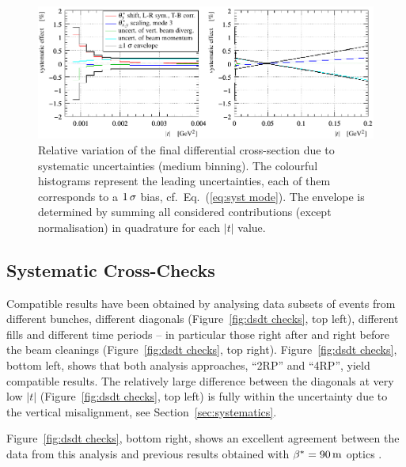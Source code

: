 \begin{figure}
\begin{center}
\includegraphics{fig/systematics_dgn_combination_summary.pdf}
\vskip-2mm
\caption{%
Relative variation of the final differential cross-section due to systematic uncertainties (medium binning). The colourful histograms represent the leading uncertainties, each of them corresponds to a $1\,{\rm \sigma}$ bias, cf.~Eq.~(\ref{eq:syst mode}). The envelope is determined by summing all considered contributions (except normalisation) in quadrature for each $|t|$ value.
}
\label{fig:syst unc}
\end{center}
\end{figure}





\subsection{Systematic Cross-Checks}
\label{sec:cross checks}

Compatible results have been obtained by analysing data subsets of events from different bunches, different diagonals (Figure~\ref{fig:dsdt checks}, top left), different fills and different time periods -- in particular those right after and right before the beam cleanings (Figure~\ref{fig:dsdt checks}, top right). Figure~\ref{fig:dsdt checks}, bottom left, shows that both analysis approaches, ``2RP'' and ``4RP'', yield compatible results. The relatively large difference between the diagonals at very low $|t|$ (Figure~\ref{fig:dsdt checks}, top left) is fully within the uncertainty due to the vertical misalignment, see Section~\ref{sec:systematics}.

Figure~\ref{fig:dsdt checks}, bottom right, shows an excellent agreement between the data from this analysis and previous results obtained with $\beta^* = 90\,{\rm m}$ optics \cite{totem-13tev-90m}.


